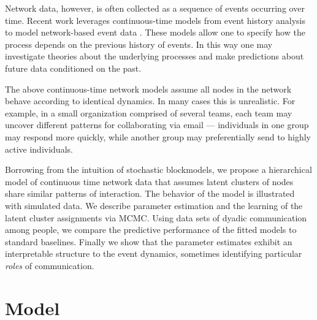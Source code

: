 \documentclass{article}
\begin{document}
Network data, however, is often collected as a sequence of events occurring over time.   Recent work leverages  continuous-time models from event history analysis  \cite{AalenOddO.2008} to model network-based event data \cite{Butts2008,Brandes2009,Perry2011,Stadtfeld2010,Stadtfeld2011,Opsahl2011,Vu2011,Vu2011a}.  These models allow one to specify how the process depends on the previous history of events.  In this way one may investigate theories about the underlying processes and make predictions about future data conditioned on the past.

The above continuous-time network models assume all nodes in the network behave according to identical dynamics.  In many cases this is unrealistic.  For example, in a small organization comprised of several teams, each team may uncover different patterns for collaborating via email --- individuals in one group may respond more quickly, while another group may preferentially send to highly active individuals.  


Borrowing from the intuition of stochastic blockmodels, we propose a hierarchical model of continuous time network data that assumes latent clusters of nodes share similar patterns of interaction.  The behavior of the model is illustrated with simulated data.  We describe parameter estimation and the learning of the latent cluster assignments via MCMC.  Using data sets of dyadic communication among people, we compare the predictive performance of the fitted models to standard baselines.  Finally we show that the parameter estimates exhibit an interpretable structure to the event dynamics, sometimes identifying particular \emph{roles} of communication.
  
\section{Model}
\end{document}
